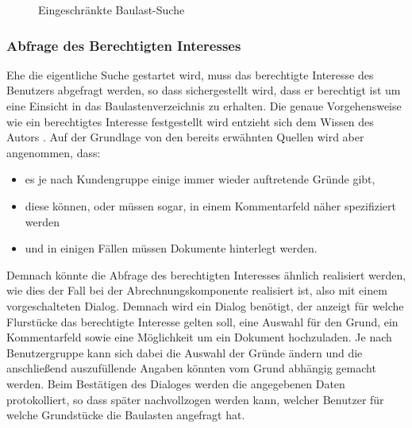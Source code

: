 \begin{figure}[htbp]
	\centering
	\caption{Eingeschränkte Baulast-Suche}
	\label{fig:baulast-suche}
\end{figure}

\subsubsection{Abfrage des Berechtigten Interesses}
Ehe die eigentliche Suche gestartet wird, muss das berechtigte Interesse des Benutzers abgefragt werden, so dass sichergestellt wird, dass er berechtigt ist um eine Einsicht in das Baulastenverzeichnis zu erhalten.
Die genaue Vorgehensweise wie ein berechtigtes Interesse festgestellt wird entzieht sich dem Wissen des Autors .
Auf der Grundlage von den bereits erwähnten Quellen wird aber angenommen, dass:
\begin{itemize}
\item es je nach Kundengruppe einige immer wieder auftretende Gründe gibt,
\item diese können, oder müssen sogar, in einem Kommentarfeld näher spezifiziert werden
\item und in einigen Fällen müssen Dokumente hinterlegt werden.
\end{itemize}
Demnach könnte die Abfrage des berechtigten Interesses ähnlich realisiert werden, wie dies der Fall bei der Abrechnungskomponente realisiert ist, also mit einem vorgeschalteten Dialog.
Demnach wird ein Dialog benötigt, der anzeigt für welche Flurstücke das berechtigte Interesse gelten soll, eine Auswahl für den Grund, ein Kommentarfeld sowie eine Möglichkeit um ein Dokument hochzuladen.
Je nach Benutzergruppe kann sich dabei die Auswahl der Gründe ändern und die anschließend auszufüllende Angaben könnten vom Grund abhängig gemacht werden.
Beim Bestätigen des Dialoges werden die angegebenen Daten protokolliert, so dass später nachvollzogen werden kann, welcher Benutzer für welche Grundstücke die Baulasten angefragt hat.

